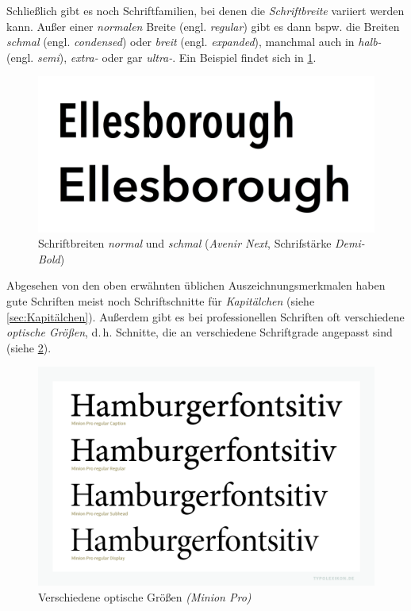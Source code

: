 Schließlich gibt es noch Schriftfamilien, bei denen die
\emph{Schriftbreite} variiert werden kann.  Außer einer
\emph{normalen} Breite
(engl. \emph{\foreignlanguage{british}{regular}}) gibt es dann
bspw. die Breiten \emph{schmal}
(engl. \emph{\foreignlanguage{british}{condensed}}) oder \emph{breit}
(engl. \emph{\foreignlanguage{british}{expanded}}), manchmal auch in
\emph{halb-} (engl. \emph{\foreignlanguage{british}{semi}}),
\emph{extra-} oder gar \emph{ultra-}.  Ein Beispiel findet sich in
\cref{fig:Schriftbreiten}.

\begin{figure}
  \centering
  \includegraphics[width=.5\textwidth]{Schriftbreiten}
  \caption{Schriftbreiten \emph{normal} und \emph{schmal}
    (\emph{Avenir Next}, Schrifstärke \emph{Demi-Bold})}
  \label{fig:Schriftbreiten}
\end{figure}

Abgesehen von den oben erwähnten üblichen Auszeichnungsmerkmalen haben
gute Schriften meist noch Schriftschnitte für \emph{Kapitälchen}
(siehe \cref{sec:Kapitälchen}).  Außerdem gibt es bei professionellen
Schriften oft verschiedene \emph{optische Größen}, d.\,h. Schnitte,
die an verschiedene Schriftgrade angepasst sind (siehe
\cref{fig:optische_Größen}).

\begin{figure}
  \centering
  \includegraphics[width=.65\textwidth]{optische_Größen}
  \caption{Verschiedene optische Größen \emph{(Minion
      Pro)}\protect\footnotemark}
  \label{fig:optische_Größen}
\end{figure}

